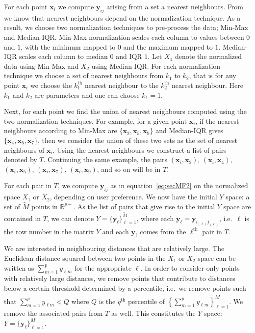 \documentclass[a4paper,12pt]{article}
\begin{document}
For each point $\bm{x}_i$ we compute $\bm{y}_{ij}$ arising from a set a nearest neighbours. From \cite{kandanaarachchi2018normalization} we know that nearest neighbours depend on the normalization technique. As a result, we choose two normalization techniques to pre-process the data; Min-Max and Median-IQR. Min-Max normalization scales each column to values between $0$ and $1$, with the minimum mapped to $0$ and the maximum mapped to $1$. Median-IQR scales each column to median $0$ and IQR $1$. Let $X_1$ denote the normalized data using Min-Max and $X_2$ using Median-IQR. For each normalization technique we choose a set of nearest neighbours from $k_1$ to $k_2$, that is for any point $\bm{x}_i$ we choose the $k_1^{\text{th}}$ nearest neighbour to the $k_2^{\text{th}}$ nearest neighbour. Here $k_1$ and $k_2$ are parameters and one can choose $k_1 =1$.

Next, for each point we find the union of nearest neighbours computed using the two normalization techniques. For example, for a given point $\bm{x}_i$, if the nearest neighbours according to Min-Max are $\{\bm{x}_2, \bm{x}_5, \bm{x}_9 \}$ and Median-IQR gives $\{\bm{x}_4, \bm{x}_5, \bm{x}_7 \}$, then we consider the union of these two sets as the set of nearest neighbours of $\bm{x}_i$. Using the nearest neighbours we construct a list of pairs denoted by $T$. Continuing the same example, the pairs $(\bm{x}_i, \bm{x}_2)$, $(\bm{x}_i, \bm{x}_4)$, $(\bm{x}_i, \bm{x}_5)$, $(\bm{x}_i, \bm{x}_7)$, $(\bm{x}_i, \bm{x}_9)$, and so on will be in $T$.

For each pair in $T$, we compute $\bm{y}_{ij}$ as in equation~\eqref{eq:secMF2} on the normalized space $X_1$ or $X_2$, depending on user preference. We now have the initial $Y$ space: a set of $\tilde{M}$ points in $\mathbb{R}^{p+}$. As the list of pairs that give rise to the initial $Y$ space are contained in $T$, we can denote $Y = \{ \bm{y}_\ell \}_{\ell=1}^{\tilde{M}}$, where each $\bm{y}_\ell = \bm{y}_{i_{(\ell)} j_{(\ell)} }$, i.e.\ $\ell$ is the row number in the matrix $Y$ and each $\bm{y}_\ell$ comes from the $\ell^{\text{th}}$ pair in $T$.

We are interested in neighbouring distances that are relatively large. The Euclidean distance squared between two points in the $X_1$ or $X_2$ space can be written as $\sum_{m=1}^p y_{\ell m}$ for the appropriate $\ell$. In order to consider only points with relatively large distances, we remove points that contribute to distances below a certain threshold determined by a percentile, i.e.\ we remove points such that $\sum_{m=1}^p y_{\ell m} < Q$ where $Q$ is the $q^{\text{th}}$ percentile of $ \left \{\sum_{m=1}^p y_{\ell m} \right \}_{\ell=1}^{\tilde{M}}$. We remove the associated pairs from $T$ as well. This constitutes the $Y$ space: $Y = \{\bm{y}_\ell \}_{\ell=1}^M$.
\end{document}

